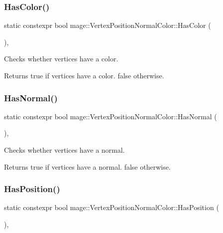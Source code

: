 \subsubsection{\texorpdfstring{Has\+Color()}{HasColor()}}
{\footnotesize\ttfamily static constexpr bool mage\+::\+Vertex\+Position\+Normal\+Color\+::\+Has\+Color (\begin{DoxyParamCaption}{ }\end{DoxyParamCaption})\hspace{0.3cm}{\ttfamily [static]}, {\ttfamily [noexcept]}}

Checks whether vertices have a color.

\begin{DoxyReturn}{Returns}
{\ttfamily true} if vertices have a color. {\ttfamily false} otherwise. 
\end{DoxyReturn}
\hypertarget{structmage_1_1_vertex_position_normal_color_a89924fd28326ffbe05b3b096f713937d}{}\label{structmage_1_1_vertex_position_normal_color_a89924fd28326ffbe05b3b096f713937d} 
\subsubsection{\texorpdfstring{Has\+Normal()}{HasNormal()}}
{\footnotesize\ttfamily static constexpr bool mage\+::\+Vertex\+Position\+Normal\+Color\+::\+Has\+Normal (\begin{DoxyParamCaption}{ }\end{DoxyParamCaption})\hspace{0.3cm}{\ttfamily [static]}, {\ttfamily [noexcept]}}

Checks whether vertices have a normal.

\begin{DoxyReturn}{Returns}
{\ttfamily true} if vertices have a normal. {\ttfamily false} otherwise. 
\end{DoxyReturn}
\hypertarget{structmage_1_1_vertex_position_normal_color_ae5e4ff514524b532f8c148a2f7e2cf8d}{}\label{structmage_1_1_vertex_position_normal_color_ae5e4ff514524b532f8c148a2f7e2cf8d} 
\subsubsection{\texorpdfstring{Has\+Position()}{HasPosition()}}
{\footnotesize\ttfamily static constexpr bool mage\+::\+Vertex\+Position\+Normal\+Color\+::\+Has\+Position (\begin{DoxyParamCaption}{ }\end{DoxyParamCaption})\hspace{0.3cm}{\ttfamily [static]}, {\ttfamily [noexcept]}}

